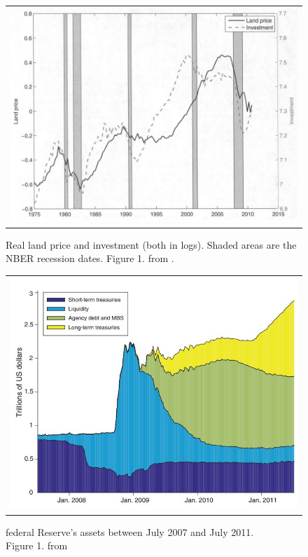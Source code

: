 \documentclass{amsart}
\theoremstyle{definition}
\theoremstyle{remark}
\numberwithin{equation}{section}
\begin{document}
\begin{figure}[h!]
    \centering
    \begin{tabular}{c}
        \includegraphics[width=0.8 \textwidth]{landpriceinvestment.JPG}
    \end{tabular}
    \caption{Real land price and investment (both in logs). Shaded areas are the NBER recession dates. Figure 1. from \cite{liu2013land}.}
    \label{fig:landpriceinvestment}
\end{figure}

\begin{figure}[h!]
    \centering
    \begin{tabular}{c}
        \includegraphics[width=0.8 \textwidth]{fedsheet.JPG}
    \end{tabular}
    \caption{federal Reserve's assets between July 2007 and July 2011.\\ Figure 1. from \cite{del2017great}}
    \label{fig:fedsheet}
\end{figure}
\end{document}
